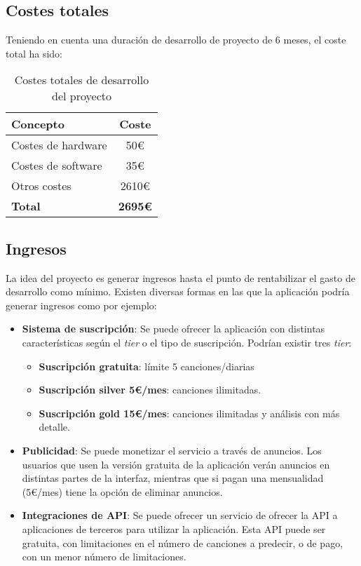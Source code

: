 \subsection{Costes totales}
Teniendo en cuenta una duración de desarrollo de proyecto de 6 meses, el coste total ha sido:

\begin{table}[h]
\centering
\begin{tabular}{|l|c|}
\hline
\textbf{Concepto} & \textbf{Coste} \\
\hline
Costes de hardware & 50€ \\
Costes de software & 35€ \\
Otros costes & 2610€ \\
\hline
\textbf{Total} & \textbf{2695€} \\
\hline
\end{tabular}
\caption{Costes totales de desarrollo del proyecto}
\end{table}

\subsection{Ingresos}
La idea del proyecto es generar ingresos hasta el punto de rentabilizar el gasto de desarrollo como mínimo. 
Existen diversas formas en las que la aplicación podría generar ingresos como por ejemplo:

\begin{itemize}
\tightlist

\item \textbf{Sistema de suscripción}: Se puede ofrecer la aplicación con distintas características según el \textit{tier} o el tipo de suscripción. Podrían existir tres \textit{tier}:
	\begin{itemize}
	\tightlist
	\item \textbf{Suscripción gratuita}: límite 5 canciones/diarias

	\item \textbf{Suscripción silver 5€/mes}: canciones ilimitadas.

	\item \textbf{Suscripción gold 15€/mes}: canciones ilimitadas y análisis con más detalle.
	\end{itemize}

\item \textbf{Publicidad}: Se puede monetizar el servicio a través de anuncios. Los usuarios que usen la versión gratuita de la aplicación verán anuncios en distintas partes de la interfaz, mientras que si pagan una mensualidad (5€/mes) tiene la opción de eliminar anuncios.

\item \textbf{Integraciones de API}: Se puede ofrecer un servicio de ofrecer la API a aplicaciones de terceros para utilizar la aplicación. Esta API puede ser gratuita, con limitaciones en el número de canciones a predecir, o de pago, con un menor número de limitaciones.
\end{itemize}

